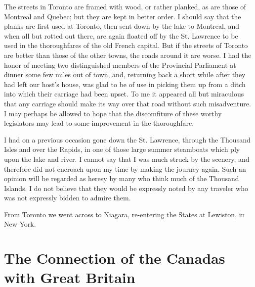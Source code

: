 The streets in Toronto are framed with wood, or rather planked, as
are those of Montreal and Quebec; but they are kept in better
order.  I should say that the planks are first used at Toronto,
then sent down by the lake to Montreal, and when all but rotted out
there, are again floated off by the St. Lawrence to be used in the
thoroughfares of the old French capital.  But if the streets of
Toronto are better than those of the other towns, the roads around
it are worse.  I had the honor of meeting two distinguished members
of the Provincial Parliament at dinner some few miles out of town,
and, returning back a short while after they had left our host's
house, was glad to be of use in picking them up from a ditch into
which their carriage had been upset.  To me it appeared all but
miraculous that any carriage should make its way over that road
without such misadventure.  I may perhaps be allowed to hope that
the discomfiture of these worthy legislators may lead to some
improvement in the thoroughfare.

I had on a previous occasion gone down the St. Lawrence, through
the Thousand Isles and over the Rapids, in one of those large
summer steamboats which ply upon the lake and river.  I cannot say
that I was much struck by the scenery, and therefore did not
encroach upon my time by making the journey again.  Such an opinion
will be regarded as heresy by many who think much of the Thousand
Islands.  I do not believe that they would be expressly noted by
any traveler who was not expressly bidden to admire them.

From Toronto we went across to Niagara, re-entering the States at
Lewiston, in New York.



\chapter{The Connection of the Canadas with Great Britain}



